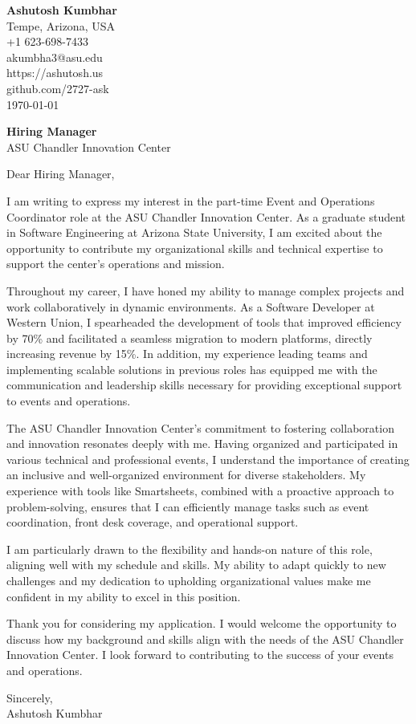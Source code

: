 \documentclass[11pt]{article}
\begin{document}
\begin{flushleft}
\textbf{Ashutosh Kumbhar} \\
Tempe, Arizona, USA \\
+1 623-698-7433 \\
akumbha3@asu.edu \\
https://ashutosh.us \\
github.com/2727-ask \\
\today
\end{flushleft}

\vspace{0.5em}

\textbf{Hiring Manager} \\
ASU Chandler Innovation Center \\

\vspace{1em}

Dear Hiring Manager,

I am writing to express my interest in the part-time Event and Operations Coordinator role at the ASU Chandler Innovation Center. As a graduate student in Software Engineering at Arizona State University, I am excited about the opportunity to contribute my organizational skills and technical expertise to support the center's operations and mission.

Throughout my career, I have honed my ability to manage complex projects and work collaboratively in dynamic environments. As a Software Developer at Western Union, I spearheaded the development of tools that improved efficiency by 70\% and facilitated a seamless migration to modern platforms, directly increasing revenue by 15\%. In addition, my experience leading teams and implementing scalable solutions in previous roles has equipped me with the communication and leadership skills necessary for providing exceptional support to events and operations.

The ASU Chandler Innovation Center’s commitment to fostering collaboration and innovation resonates deeply with me. Having organized and participated in various technical and professional events, I understand the importance of creating an inclusive and well-organized environment for diverse stakeholders. My experience with tools like Smartsheets, combined with a proactive approach to problem-solving, ensures that I can efficiently manage tasks such as event coordination, front desk coverage, and operational support.

I am particularly drawn to the flexibility and hands-on nature of this role, aligning well with my schedule and skills. My ability to adapt quickly to new challenges and my dedication to upholding organizational values make me confident in my ability to excel in this position.

Thank you for considering my application. I would welcome the opportunity to discuss how my background and skills align with the needs of the ASU Chandler Innovation Center. I look forward to contributing to the success of your events and operations.

Sincerely, \\
Ashutosh Kumbhar
\end{document}
